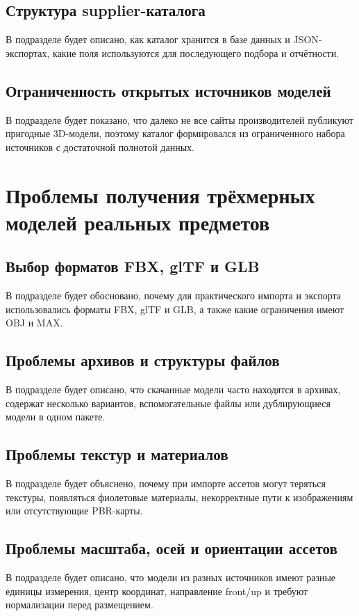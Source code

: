 \documentclass[times]{itmo-student-thesis}
\begin{document}
\subsection{Структура supplier-каталога}
В подразделе будет описано, как каталог хранится в базе данных и JSON-экспортах, какие поля используются для последующего подбора и отчётности.

\subsection{Ограниченность открытых источников моделей}
В подразделе будет показано, что далеко не все сайты производителей публикуют пригодные 3D-модели, поэтому каталог формировался из ограниченного набора источников с достаточной полнотой данных.

\section{Проблемы получения трёхмерных моделей реальных предметов}

\subsection{Выбор форматов FBX, glTF и GLB}
В подразделе будет обосновано, почему для практического импорта и экспорта использовались форматы FBX, glTF и GLB, а также какие ограничения имеют OBJ и MAX.

\subsection{Проблемы архивов и структуры файлов}
В подразделе будет описано, что скачанные модели часто находятся в архивах, содержат несколько вариантов, вспомогательные файлы или дублирующиеся модели в одном пакете.

\subsection{Проблемы текстур и материалов}
В подразделе будет объяснено, почему при импорте ассетов могут теряться текстуры, появляться фиолетовые материалы, некорректные пути к изображениям или отсутствующие PBR-карты.

\subsection{Проблемы масштаба, осей и ориентации ассетов}
В подразделе будет описано, что модели из разных источников имеют разные единицы измерения, центр координат, направление front/up и требуют нормализации перед размещением.
\end{document}
